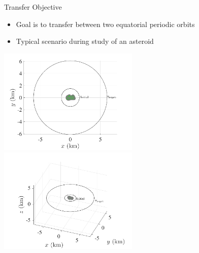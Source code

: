 \begin{frame}{Transfer Objective} %

\begin{itemize}
    \item Goal is to transfer between two equatorial periodic orbits
    \item Typical scenario during study of an asteroid
\end{itemize}

\begin{center}
    \includegraphics[width=0.5\textwidth]{figures/2016AAS/initial_transfer.pdf}
    \hfill
    \includegraphics[width=0.5\textwidth]{figures/2016AAS/initial_transfer_3d.pdf}
\end{center}

\end{frame}%

